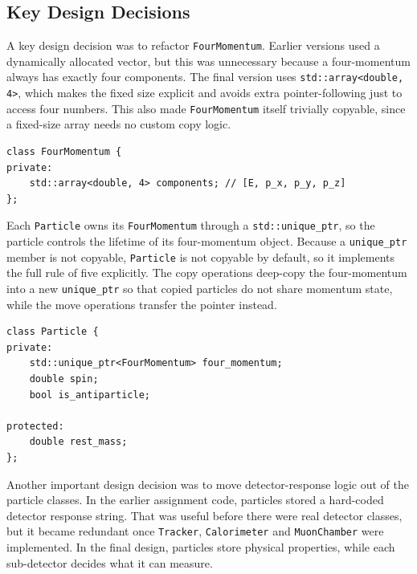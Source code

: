 \documentclass[11pt,a4paper]{article}
\begin{document}
\subsection{Key Design Decisions}

A key design decision was to refactor \texttt{FourMomentum}. Earlier versions used a dynamically allocated vector, but this was unnecessary because a four-momentum always has exactly four components. The final version uses \texttt{std::array<double, 4>}, which makes the fixed size explicit and avoids extra pointer-following just to access four numbers. This also made \texttt{FourMomentum} itself trivially copyable, since a fixed-size array needs no custom copy logic.

\begin{lstlisting}[caption={Fixed-size storage inside the \texttt{FourMomentum} class.}, label={lst:fourmomentumarray}]
class FourMomentum {
private:
    std::array<double, 4> components; // [E, p_x, p_y, p_z]
};
\end{lstlisting}

Each \texttt{Particle} owns its \texttt{FourMomentum} through a \texttt{std::unique\_ptr}, so the particle controls the lifetime of its four-momentum object. Because a \texttt{unique\_ptr} member is not copyable, \texttt{Particle} is not copyable by default, so it implements the full rule of five explicitly. The copy operations deep-copy the four-momentum into a new \texttt{unique\_ptr} so that copied particles do not share momentum state, while the move operations transfer the pointer instead.

\begin{lstlisting}[caption={Particle ownership of its \texttt{FourMomentum} object.}, label={lst:particlefourmomentum}]
class Particle {
private:
    std::unique_ptr<FourMomentum> four_momentum;
    double spin;
    bool is_antiparticle;

protected:
    double rest_mass;
};
\end{lstlisting}

Another important design decision was to move detector-response logic out of the particle classes. In the earlier assignment code, particles stored a hard-coded detector response string. That was useful before there were real detector classes, but it became redundant once \texttt{Tracker}, \texttt{Calorimeter} and \texttt{MuonChamber} were implemented. In the final design, particles store physical properties, while each sub-detector decides what it can measure.
\end{document}
